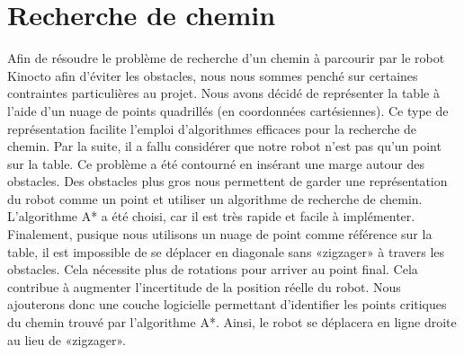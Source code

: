 \section{Recherche de chemin}
Afin de résoudre le problème de recherche d'un chemin à parcourir par le robot Kinocto afin d'éviter les obstacles, nous nous sommes penché sur certaines contraintes particulières au projet. Nous avons décidé de représenter la table à l'aide d'un nuage de points quadrillés (en coordonnées cartésiennes). Ce type de représentation facilite l'emploi d'algorithmes efficaces pour la recherche de chemin. Par la suite, il a fallu considérer que notre robot n'est pas qu'un point  sur la table. Ce problème a été contourné en insérant une marge autour des obstacles. Des obstacles plus gros nous permettent de garder une représentation du robot comme un point et utiliser un algorithme de recherche de chemin. L'algorithme A* a été choisi, car il est très rapide et facile à implémenter. Finalement, pusique nous utilisons un nuage de point comme référence sur la table, il est impossible de se déplacer en diagonale sans «zigzager» à travers les obstacles. Cela nécessite plus de rotations pour arriver au point final. Cela contribue à augmenter l'incertitude de la position réelle du robot. Nous ajouterons donc une couche logicielle permettant d'identifier les points critiques du chemin trouvé par l'algorithme A*. Ainsi, le robot se déplacera en ligne droite au lieu de «zigzager».  

